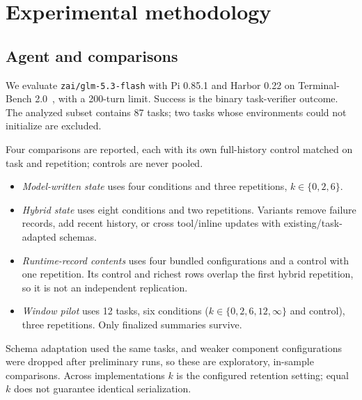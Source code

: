 \section{Experimental methodology}
\label{sec:setup}
\subsection{Agent and comparisons}
We evaluate \texttt{zai/glm-5.3-flash} with Pi 0.85.1 and Harbor 0.22
on Terminal-Bench 2.0~\citep{terminalbench}, with a 200-turn limit.
Success is the binary task-verifier outcome. The analyzed subset contains
87 tasks; two tasks whose environments could not initialize are excluded.

Four comparisons are reported, each with its own full-history control
matched on task and repetition; controls are never pooled.
\begin{itemize}\itemsep0pt
\item \emph{Model-written state} uses four conditions and three repetitions,
 $k\in\{0,2,6\}$.
\item \emph{Hybrid state} uses eight conditions and two repetitions. Variants
 remove failure records, add recent history, or cross tool/inline updates
 with existing/task-adapted schemas.
\item \emph{Runtime-record contents} uses four bundled configurations and a
 control with one repetition. Its control and richest rows overlap the first
 hybrid repetition, so it is not an independent replication.
\item \emph{Window pilot} uses 12 tasks, six conditions ($k\in\{0,2,6,12,\infty\}$
 and control), three repetitions. Only finalized summaries survive.
\end{itemize}
Schema adaptation used the same tasks, and weaker component configurations
were dropped after preliminary runs, so these are exploratory, in-sample
comparisons. Across implementations $k$ is the configured retention setting;
equal $k$ does not guarantee identical serialization.

